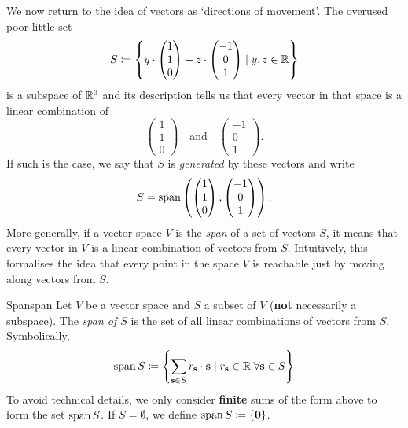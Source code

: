 We now return to the idea of vectors as `directions of movement'. The overused
poor little set
\[
 S \coloneqq \left\{ 
  y \cdot 
  \begin{pmatrix}
   1\\
   1\\
   0
  \end{pmatrix}
  + z \cdot 
  \begin{pmatrix}
   -1\\
   0\\
   1
  \end{pmatrix} \mid y,z \in \mathbb{R}
 \right\}
\]
is a subspace of $\mathbb{R}^3$ and its description tells us that every vector in that
space is a linear combination of
\[
 \begin{pmatrix}
  1\\
  1\\
  0
 \end{pmatrix}
 \quad \text{and} \quad 
 \begin{pmatrix}
  -1\\
  0\\
  1
 \end{pmatrix}.
\]
If such is the case, we say that $S$ is \emph{generated} by these vectors and
write
\[
 S = \operatorname{span} \left(    \begin{pmatrix}
    1\\
    1\\
    0
   \end{pmatrix},
   \begin{pmatrix}
    -1\\
    0\\
    1
   \end{pmatrix}
 \right).
\]
More generally, if a vector space $V$ is the \emph{span} of a set of vectors
$S$, it means that every vector in $V$ is a linear combination of vectors from
$S$. Intuitively, this formalises the idea that every point in the space $V$ is
reachable just by moving along vectors from $S$.

\begin{definition}{Span}{span}
 Let $V$ be a vector space and $S$ a subset of $V$ (\textbf{not} necessarily a
 subspace). The \emph{span of $S$} is the set of all linear combinations of
 vectors from $S$. Symbolically,
 \[
  \operatorname{span} S \coloneqq \left\{\sum_{\mathbf{s} \in S} r_{\mathbf{s}} \cdot
  \mathbf{s} \mid r_{\mathbf{s}} \in \mathbb{R} \; \forall \mathbf{s} \in S \right\}
 \]
 To avoid technical details, we only consider \textbf{finite} sums of the form
 above to form the set $\operatorname{span} S$. If $S = \emptyset$, we define $\operatorname{span} S \coloneqq
 \{\mathbf{0}\}$.
\end{definition}

